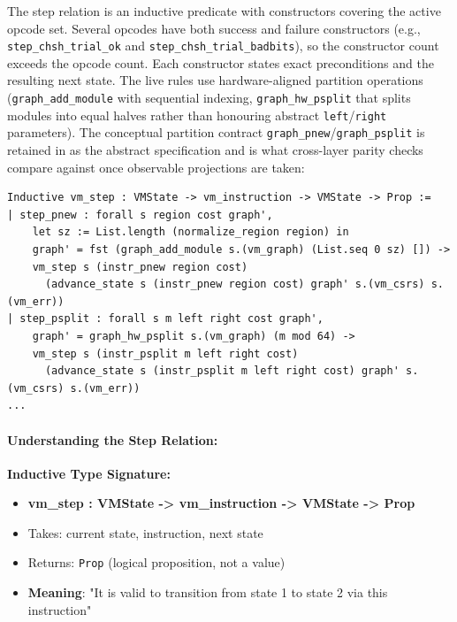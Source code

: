 The step relation is an inductive predicate with constructors covering the active opcode set. Several opcodes have both success and failure constructors (e.g., \texttt{step\_chsh\_trial\_ok} and \texttt{step\_chsh\_trial\_badbits}), so the constructor count exceeds the opcode count. Each constructor states exact preconditions and the resulting next state. The live rules use hardware-aligned partition operations (\texttt{graph\_add\_module} with sequential indexing, \texttt{graph\_hw\_psplit} that splits modules into equal halves rather than honouring abstract \texttt{left}/\texttt{right} parameters). The conceptual partition contract \texttt{graph\_pnew}/\texttt{graph\_psplit} is retained in  as the abstract specification and is what cross-layer parity checks compare against once observable projections are taken:
\begin{lstlisting}
Inductive vm_step : VMState -> vm_instruction -> VMState -> Prop :=
| step_pnew : forall s region cost graph',
    let sz := List.length (normalize_region region) in
    graph' = fst (graph_add_module s.(vm_graph) (List.seq 0 sz) []) ->
    vm_step s (instr_pnew region cost)
      (advance_state s (instr_pnew region cost) graph' s.(vm_csrs) s.(vm_err))
| step_psplit : forall s m left right cost graph',
    graph' = graph_hw_psplit s.(vm_graph) (m mod 64) ->
    vm_step s (instr_psplit m left right cost)
      (advance_state s (instr_psplit m left right cost) graph' s.(vm_csrs) s.(vm_err))
...
\end{lstlisting}

\paragraph{Understanding the Step Relation:}
\textbf{Inductive Type Signature:}
\begin{itemize}
    \item \textbf{vm\_step : VMState -> vm\_instruction -> VMState -> Prop}
    \item Takes: current state, instruction, next state
    \item Returns: \texttt{Prop} (logical proposition, not a value)
    \item \textbf{Meaning}: "It is valid to transition from state 1 to state 2 via this instruction"
\end{itemize}

